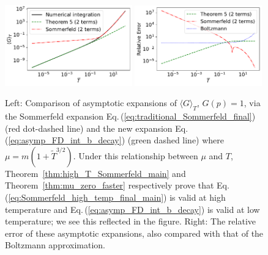\documentclass[sn-mathphys,Numbered]{sn-jnl}
\newcommand{\req}[1]{Eq.\,(\ref{#1})}
\newcommand{\rTh}[1]{Theorem~{\ref{#1}}}
\begin{document}
\begin{figure}[h] %
\centering
\includegraphics[width=0.49\textwidth]{./plot/Sommerfeld_high_temp_comparison.pdf}
\includegraphics[width=0.49\textwidth]{./plot/Sommerfeld_high_temp_relative_error_comparison.pdf}
\caption{Left: Comparison of asymptotic expansions of $\langle G\rangle_{T}$, $G(p)=1$, via the Sommerfeld expansion \req{eq:traditional_Sommerfeld_final} (red dot-dashed line) and the new expansion \req{eq:asymp_FD_int_b_decay} (green dashed line) where $\mu=m(1+\widetilde{T}^{3/2})$. Under this relationship between $\mu$ and $T$, \rTh{thm:high_T_Sommerfeld_main} and \rTh{thm:mu_zero_faster} respectively prove that \req{eq:Sommerfeld_high_temp_final_main} is valid at high temperature and \req{eq:asymp_FD_int_b_decay} is valid at low temperature; we see this reflected in the figure. Right: The relative error of these asymptotic expansions, also compared with that of the Boltzmann approximation. }\label{fig:FD_avg_expansion_comparison_Sommerfeld}
\end{figure}
\end{document}
